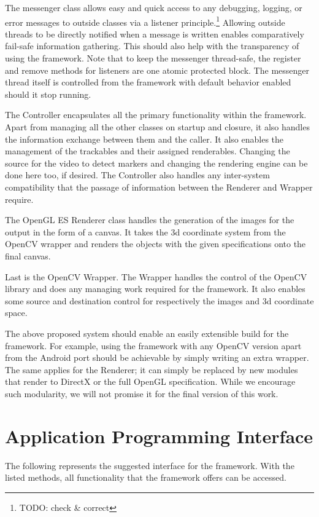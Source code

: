 The messenger class allows easy and quick access to any debugging, logging, or error messages to outside classes via a listener principle.\footnote{TODO: check & correct}
Allowing outside threads to be directly notified when a message is written enables comparatively fail-safe information gathering.
This should also help with the transparency of using the framework.
Note that to keep the messenger thread-safe, the register and remove methods for listeners are one atomic protected block.
The messenger thread itself is controlled from the framework with default behavior enabled should it stop running.

The Controller encapsulates all the primary functionality within the framework.
Apart from managing all the other classes on startup and closure, it also handles the information exchange between them and the caller.
It also enables the management of the trackables and their assigned renderables.
Changing the source for the video to detect markers and changing the rendering engine can be done here too, if desired.
The Controller also handles any inter-system compatibility that the passage of information between the Renderer and Wrapper require.

The OpenGL ES Renderer class handles the generation of the images for the output in the form of a canvas.
It takes the 3d coordinate system from the OpenCV wrapper and renders the objects with the given specifications onto the final canvas.

Last is the OpenCV Wrapper. The Wrapper handles the control of the OpenCV library and does any managing work required for the framework.
It also enables some source and destination control for respectively the images and 3d coordinate space.

The above proposed system should enable an easily extensible build for the framework.
For example, using the framework with any OpenCV version apart from the Android port should be achievable by simply writing an extra wrapper.
The same applies for the Renderer; it can simply be replaced by new modules that render to DirectX or the full OpenGL specification.
While we encourage such modularity, we will not promise it for the final version of this work.

\section{Application Programming Interface}

The following represents the suggested interface for the framework.
With the listed methods, all functionality that the framework offers can be accessed.

